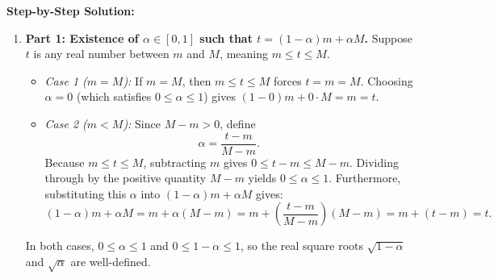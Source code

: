 \documentclass[11pt, letterpaper]{article}
\theoremstyle{definition}
\theoremstyle{remark}
\begin{document}
\textbf{Step-by-Step Solution:}
\begin{enumerate}[leftmargin=2em]
    \item \textbf{Part 1: Existence of $\alpha \in [0, 1]$ such that $t = (1 - \alpha)m + \alpha M$.}
    Suppose $t$ is any real number between $m$ and $M$, meaning $m \le t \le M$.
    \begin{itemize}
        \item \emph{Case 1 ($m = M$):} If $m = M$, then $m \le t \le M$ forces $t = m = M$. Choosing $\alpha = 0$ (which satisfies $0 \le \alpha \le 1$) gives $(1 - 0)m + 0 \cdot M = m = t$.
        \item \emph{Case 2 ($m < M$):} Since $M - m > 0$, define
        \[
        \alpha = \frac{t - m}{M - m}.
        \]
        Because $m \le t \le M$, subtracting $m$ gives $0 \le t - m \le M - m$. Dividing through by the positive quantity $M - m$ yields $0 \le \alpha \le 1$. Furthermore, substituting this $\alpha$ into $(1 - \alpha)m + \alpha M$ gives:
        \[
        (1 - \alpha)m + \alpha M = m + \alpha(M - m) = m + \left(\frac{t - m}{M - m}\right)(M - m) = m + (t - m) = t.
        \]
    \end{itemize}
    In both cases, $0 \le \alpha \le 1$ and $0 \le 1 - \alpha \le 1$, so the real square roots $\sqrt{1 - \alpha}$ and $\sqrt{\alpha}$ are well-defined.


\end{enumerate}
\end{document}
